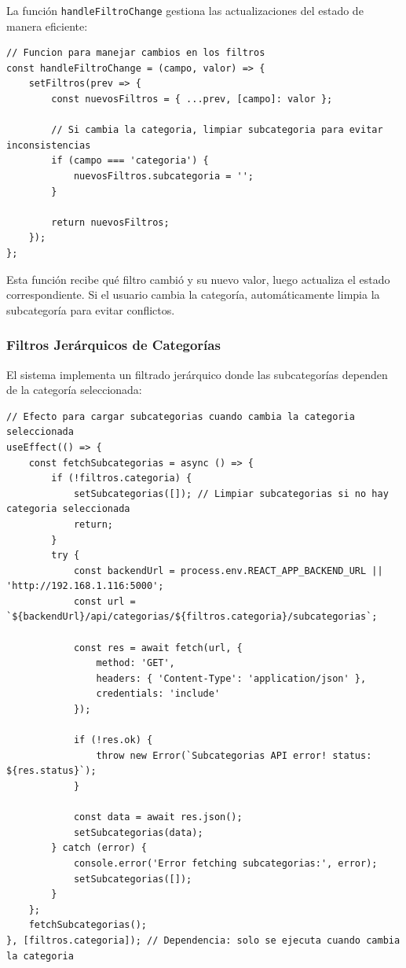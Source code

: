 \documentclass[a4paper,12pt]{article}
\begin{document}
La función \texttt{handleFiltroChange} gestiona las actualizaciones del estado de manera eficiente:

\begin{lstlisting}[language=JSX, caption={Funcion de manejo de cambios en filtros}]
// Funcion para manejar cambios en los filtros
const handleFiltroChange = (campo, valor) => {
    setFiltros(prev => {
        const nuevosFiltros = { ...prev, [campo]: valor };
        
        // Si cambia la categoria, limpiar subcategoria para evitar inconsistencias
        if (campo === 'categoria') {
            nuevosFiltros.subcategoria = '';
        }
        
        return nuevosFiltros;
    });
};
\end{lstlisting}

Esta función recibe qué filtro cambió y su nuevo valor, luego actualiza el estado correspondiente. Si el usuario cambia la categoría, automáticamente limpia la subcategoría para evitar conflictos.
\newpage
\subsubsection{Filtros Jerárquicos de Categorías}

El sistema implementa un filtrado jerárquico donde las subcategorías dependen de la categoría seleccionada:

\begin{lstlisting}[language=JSX, caption={Carga dinamica de subcategorias}]
// Efecto para cargar subcategorias cuando cambia la categoria seleccionada
useEffect(() => {
    const fetchSubcategorias = async () => {
        if (!filtros.categoria) {
            setSubcategorias([]); // Limpiar subcategorias si no hay categoria seleccionada
            return;
        }
        try {
            const backendUrl = process.env.REACT_APP_BACKEND_URL || 'http://192.168.1.116:5000';
            const url = `${backendUrl}/api/categorias/${filtros.categoria}/subcategorias`;
            
            const res = await fetch(url, {
                method: 'GET',
                headers: { 'Content-Type': 'application/json' },
                credentials: 'include'
            });
            
            if (!res.ok) {
                throw new Error(`Subcategorias API error! status: ${res.status}`);
            }
            
            const data = await res.json();
            setSubcategorias(data);
        } catch (error) {
            console.error('Error fetching subcategorias:', error);
            setSubcategorias([]);
        }
    };
    fetchSubcategorias();
}, [filtros.categoria]); // Dependencia: solo se ejecuta cuando cambia la categoria
\end{lstlisting}
\end{document}
